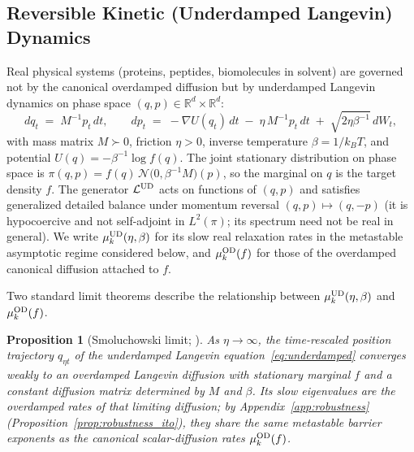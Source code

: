\documentclass{article}
\newcommand{\R}{\mathbb{R}}
\newtheorem{proposition}{Proposition}
\begin{document}
\subsection{Reversible Kinetic (Underdamped Langevin) Dynamics}
\label{app:robustness_kinetic}

Real physical systems (proteins, peptides, biomolecules in solvent) are governed not by the canonical overdamped diffusion but by underdamped Langevin dynamics on phase space $(q, p) \in \R^d \times \R^d$:
\begin{equation}
dq_t \;=\; M^{-1} p_t\,dt, \qquad
dp_t \;=\; -\nabla U(q_t)\,dt \;-\; \eta\,M^{-1} p_t\,dt \;+\; \sqrt{2 \eta \beta^{-1}}\,dW_t,
\label{eq:underdamped}
\end{equation}
with mass matrix $M \succ 0$, friction $\eta > 0$, inverse temperature $\beta = 1/k_B T$, and potential $U(q) = -\beta^{-1}\log f(q)$. The joint stationary distribution on phase space is
$\pi(q, p) = f(q)\,\mathcal{N}\!\bigl(0, \beta^{-1} M\bigr)(p)$,
so the marginal on $q$ is the target density $f$. The generator $\mathcal{L}^{\rm UD}$ acts on functions of $(q, p)$ and satisfies generalized detailed balance under momentum reversal $(q, p) \mapsto (q, -p)$ (it is hypocoercive and not self-adjoint in $L^2(\pi)$; its spectrum need not be real in general). We write $\mu_k^{\rm UD}(\eta, \beta)$ for its slow real relaxation rates in the metastable asymptotic regime considered below, and $\mu_k^{\rm OD}(f)$ for those of the overdamped canonical diffusion attached to $f$.

Two standard limit theorems describe the relationship between $\mu_k^{\rm UD}(\eta, \beta)$ and $\mu_k^{\rm OD}(f)$.

\begin{proposition}[Smoluchowski limit; \cite{pavliotis_stuart2008,Pavliotis2014}]
\label{thm:smoluchowski}
As $\eta \to \infty$, the time-rescaled position trajectory $q_{\eta t}$ of the underdamped Langevin equation~\eqref{eq:underdamped} converges weakly to an overdamped Langevin diffusion with stationary marginal $f$ and a constant diffusion matrix determined by $M$ and $\beta$. Its slow eigenvalues are the overdamped rates of that limiting diffusion; by Appendix~\ref{app:robustness} (Proposition~\ref{prop:robustness_ito}), they share the same metastable barrier exponents as the canonical scalar-diffusion rates $\mu_k^{\rm OD}(f)$.
\end{proposition}
\end{document}
